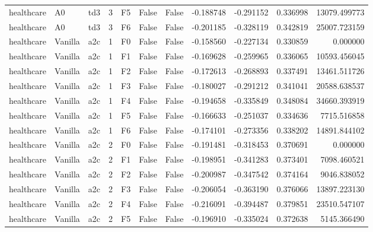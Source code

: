 \begin{tabular}{lllrlllrrrr}
healthcare &      A0 &       td3 &     3 &  F5 &           False &            False & -0.188748 & -0.291152 & 0.336998 &     13079.499773 \\
healthcare &      A0 &       td3 &     3 &  F6 &           False &            False & -0.201185 & -0.328119 & 0.342819 &     25007.723159 \\
healthcare & Vanilla &       a2c &     1 &  F0 &           False &            False & -0.158560 & -0.227134 & 0.330859 &         0.000000 \\
healthcare & Vanilla &       a2c &     1 &  F1 &           False &            False & -0.169628 & -0.259965 & 0.336065 &     10593.456045 \\
healthcare & Vanilla &       a2c &     1 &  F2 &           False &            False & -0.172613 & -0.268893 & 0.337491 &     13461.511726 \\
healthcare & Vanilla &       a2c &     1 &  F3 &           False &            False & -0.180027 & -0.291212 & 0.341041 &     20588.638537 \\
healthcare & Vanilla &       a2c &     1 &  F4 &           False &            False & -0.194658 & -0.335849 & 0.348084 &     34660.393919 \\
healthcare & Vanilla &       a2c &     1 &  F5 &           False &            False & -0.166633 & -0.251037 & 0.334636 &      7715.516858 \\
healthcare & Vanilla &       a2c &     1 &  F6 &           False &            False & -0.174101 & -0.273356 & 0.338202 &     14891.844102 \\
healthcare & Vanilla &       a2c &     2 &  F0 &           False &            False & -0.191481 & -0.318453 & 0.370691 &         0.000000 \\
healthcare & Vanilla &       a2c &     2 &  F1 &           False &            False & -0.198951 & -0.341283 & 0.373401 &      7098.460521 \\
healthcare & Vanilla &       a2c &     2 &  F2 &           False &            False & -0.200987 & -0.347542 & 0.374164 &      9046.838052 \\
healthcare & Vanilla &       a2c &     2 &  F3 &           False &            False & -0.206054 & -0.363190 & 0.376066 &     13897.223130 \\
healthcare & Vanilla &       a2c &     2 &  F4 &           False &            False & -0.216091 & -0.394487 & 0.379851 &     23510.547107 \\
healthcare & Vanilla &       a2c &     2 &  F5 &           False &            False & -0.196910 & -0.335024 & 0.372638 &      5145.366490 \\

\end{tabular}
